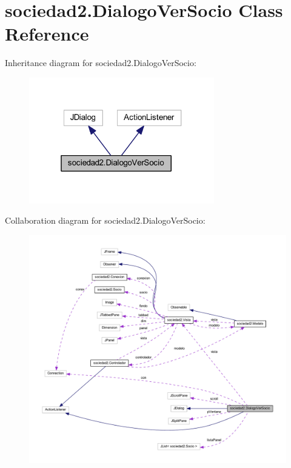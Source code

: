 \hypertarget{classsociedad2_1_1_dialogo_ver_socio}{}\section{sociedad2.\+Dialogo\+Ver\+Socio Class Reference}
\label{classsociedad2_1_1_dialogo_ver_socio}


Inheritance diagram for sociedad2.\+Dialogo\+Ver\+Socio\+:\nopagebreak
\begin{figure}[H]
\begin{center}
\leavevmode
\includegraphics[width=229pt]{classsociedad2_1_1_dialogo_ver_socio__inherit__graph}
\end{center}
\end{figure}


Collaboration diagram for sociedad2.\+Dialogo\+Ver\+Socio\+:
\nopagebreak
\begin{figure}[H]
\begin{center}
\leavevmode
\includegraphics[width=350pt]{classsociedad2_1_1_dialogo_ver_socio__coll__graph}
\end{center}
\end{figure}
